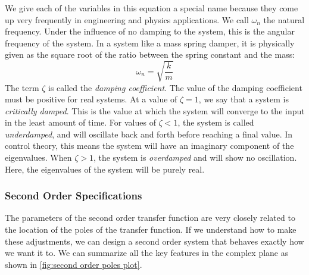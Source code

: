 We give each of the variables in this equation a special name because they come up very frequently in engineering and physics applications. We call $\omega_n$ the natural frequency. Under the influence of no damping to the system, this is the angular frequency of the system. In a system like a mass spring damper, it is physically given as the square root of the ratio between the spring constant and the mass:
$$\omega_n=\sqrt{\frac{k}{m}}$$
The term $\zeta$ is called the \textit{damping coefficient}. The value of the damping coefficient must be positive for real systems. At a value of $\zeta=1$, we say that a system is \textit{critically damped}. This is the value at which the system will converge to the input in the least amount of time. For values of $\zeta<1$, the system is called \textit{underdamped}, and will oscillate back and forth before reaching a final value. In control theory, this means the system will have an imaginary component of the eigenvalues. When $\zeta>1$, the system is \textit{overdamped} and will show no oscillation. Here, the eigenvalues of the system will be purely real.

\subsubsection{Second Order Specifications}
The parameters of the second order transfer function are very closely related to the location of the poles of the transfer function. If we understand how to make these adjustments, we can design a second order system that behaves exactly how we want it to. We can summarize all the key features in the complex plane as shown in \autoref{fig:second order poles plot}.

